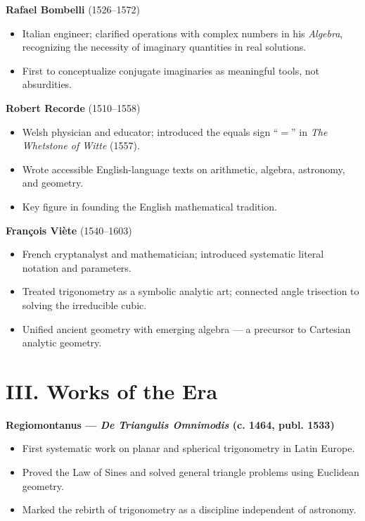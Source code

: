 \documentclass[9pt]{article}
\begin{document}
\textbf{Rafael Bombelli} (1526–1572)

\begin{itemize}
    \item Italian engineer; clarified operations with complex numbers in his \textit{Algebra}, recognizing the necessity of imaginary quantities in real solutions.
    \item First to conceptualize conjugate imaginaries as meaningful tools, not absurdities.
\end{itemize}

\textbf{Robert Recorde} (1510–1558)

\begin{itemize}
    \item Welsh physician and educator; introduced the equals sign ``$=$'' in \textit{The Whetstone of Witte} (1557).
    \item Wrote accessible English-language texts on arithmetic, algebra, astronomy, and geometry.
    \item Key figure in founding the English mathematical tradition.
\end{itemize}

\textbf{Fran\c{c}ois Vi\`ete} (1540–1603)

\begin{itemize}
    \item French cryptanalyst and mathematician; introduced systematic literal notation and parameters.
    \item Treated trigonometry as a symbolic analytic art; connected angle trisection to solving the irreducible cubic.
    \item Unified ancient geometry with emerging algebra — a precursor to Cartesian analytic geometry.
\end{itemize}



\newpage


\section*{III. Works of the Era}

\textbf{Regiomontanus — \textit{De Triangulis Omnimodis} (c. 1464, publ. 1533)}

\begin{itemize}
    \item First systematic work on planar and spherical trigonometry in Latin Europe.
    \item Proved the Law of Sines and solved general triangle problems using Euclidean geometry.
    \item Marked the rebirth of trigonometry as a discipline independent of astronomy.
\end{itemize}
\end{document}
